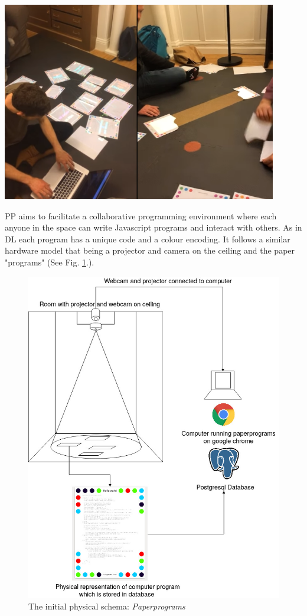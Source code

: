 \documentclass[12pt]{report}
\begin{document}
\begin{center}
\includegraphics[width=12cm]{assets/pp_action2.png}
\end{center}


PP aims to facilitate a collaborative programming environment where each anyone
in the space can write Javascript programs and interact with others. As in DL
each program has a unique code and a colour encoding. It follows a similar
hardware model that being a projector and camera on the ceiling and the paper
"programs" (See Fig. \ref{pp-schema}.).



\begin{figure}[htbp]
\centering
\includegraphics[width=15cm]{assets/pp-diag.png}
\caption{The initial physical schema: \emph{Paperprograms} \label{pp-schema}}
\end{figure}
\end{document}
